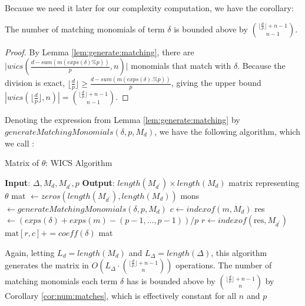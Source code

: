 Because we need it later for our complexity computation, we have the corollary:

\begin{cor}
    \label{cor:num:matches}
    The number of matching monomials of term $\delta$ is bounded above by $\binom{\lfloor \frac{d}{p} \rfloor + n - 1}{n - 1}$.
\end{cor}

\begin{proof}
    By Lemma \ref{lem:generate:matching}, there are $\Big |wics \left(\frac{d - sum(m(exps(\delta) \% p))}{p}, n \right) \Big |$ monomials that match with $\delta$.
    Because the division is exact, $\lfloor \frac{d}{p} \rfloor \geq \frac{d - sum(m(exps(\delta) .\% p))}{p}$,
    giving the upper bound $|wics(\lfloor \frac{d}{p} \rfloor, n)| = \binom{\lfloor \frac{d}{p} \rfloor + n - 1}{n - 1}$.
\end{proof}

Denoting the expression from Lemma \ref{lem:generate:matching} by $generateMatchingMonomials(\delta, p, M_d)$, we have
the following algorithm, which we call \wics:

\begin{algorithm}[H]
    \caption{Matrix of $\theta$: WICS Algorithm}
    \label{alg:matrix:WICS}
    \begin{algorithmic}[1]
    \State \textbf{Input}: $\Delta, M_{d}, M_{d^{\prime}}, p$
    \State \textbf{Output}: $length(M_{d^{\prime}}) \times length(M_{d})$ matrix representing $\theta$
    \State mat $\gets zeros(length(M_{d^{\prime}}), length(M_{d}))$
    \For{$\delta \in \Delta$}
        \State mons $\gets generateMatchingMonomials(\delta, p, M_{d})$
		    \State $c \gets indexof(m,M_{d})$
			\State res $\gets (exps(\delta) + exps(m) - (p-1, \ldots, p-1)) / p$
			\State $r \gets indexof(\text{res},M_{d^{\prime}})$
            \State $\text{mat}[r, c] += coeff(\delta)$
        \EndFor
    \EndFor
    \State \Return mat
    \end{algorithmic}
\end{algorithm}

Again, letting $L_{d} = length(M_d)$ and $L_{\Delta} = length(\Delta)$, this algorithm generates the matrix in $O \left( L_{\Delta} \cdot \binom{\lfloor \frac{d}{p} \rfloor + n - 1}{n} \right)$ operations.
The number of matching monomials each term $\delta$ has is bounded above by $\binom{\lfloor \frac{d}{p} \rfloor + n - 1}{n}$ by Corollary \ref{cor:num:matches}, which is effectively constant for all $n$ and $p$ 

